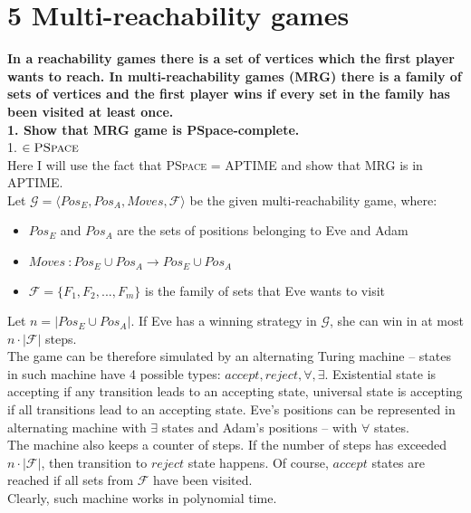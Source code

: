 \section*{5 Multi-reachability games}
\textbf{In a reachability games there is a set of vertices which the first player
wants to reach. In multi-reachability games (MRG) there is a family of
sets of vertices and the first player wins if every set in the family has been
visited at least once.\\
1. Show that MRG game is PSpace-complete.}\\
1. \underline{$\in \textsc{PSpace}$}\\
Here I will use the fact that \textsc{PSpace} = \textsc{APTIME} and show that
MRG is in \textsc{APTIME}.\\
Let $\mathcal{G} = \langle Pos_E, Pos_A, Moves, \mathcal{F} \rangle$ be the given
multi-reachability game, where:
\begin{itemize}
      \item $Pos_E$ and $Pos_A$ are the sets of positions belonging to Eve and Adam
      \item $Moves\ : Pos_E \cup Pos_A \rightarrow Pos_E \cup Pos_A$
      \item $\mathcal{F} = \{ F_1, F_2, ..., F_m \}$ is the family of sets that Eve wants to visit
\end{itemize}
Let $n = |Pos_E \cup Pos_A|$. If Eve has a winning strategy in $\mathcal{G}$, she
can win in at most $n \cdot |\mathcal{F}|$ steps.\\
The game can be therefore simulated by an alternating Turing machine -- states in such machine
have 4 possible types: $accept, reject, \forall, \exists$. Existential state is accepting if any transition
leads to an accepting state, universal state is accepting if all transitions lead to an accepting state.
Eve's positions can be represented in alternating machine with $\exists$ states and Adam's positions -- 
with $\forall$ states.\\
The machine also keeps a counter of steps. If the number of steps has exceeded $n \cdot |\mathcal{F}|$,
then transition to $reject$ state happens. Of course, $accept$ states are reached if all sets from
$\mathcal{F}$ have been visited.\\
Clearly, such machine works in polynomial time.\\


